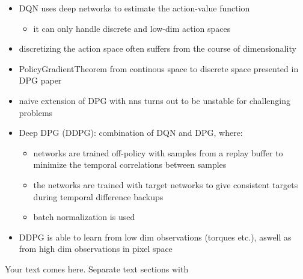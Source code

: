 \begin{itemize}
\item DQN uses deep networks to estimate the action-value function
\begin{itemize}
\item it can only handle discrete and low-dim action spaces
\end{itemize}
\item discretizing the action space often suffers from the course of dimensionality
\item PolicyGradientTheorem from continous space to discrete space presented in DPG paper
\item naive extension of DPG with nns turns out to be unstable for challenging problems
\item Deep DPG (DDPG): combination of DQN and DPG, where:
\begin{itemize}
\item networks are trained off-policy with samples from a replay buffer to minimize the temporal correlations between samples
\item the networks are trained with target networks to give consistent targets during temporal difference backups
\item batch normalization is used
\end{itemize}
\item DDPG is able to learn from low dim observations (torques etc.), aswell as from high dim observations in pixel space
\end{itemize}
Your text comes here. Separate text sections with


